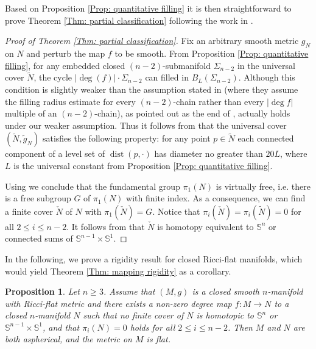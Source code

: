 \documentclass[11pt,letterpaper]{amsart}
\numberwithin{equation}{section}
\newtheorem{proposition}[theorem]{Proposition}
\theoremstyle{definition}
\DeclareMathOperator{\dist}{dist}
\begin{document}
Based on Proposition \ref{Prop: quantitative filling} it is then straightforward to prove Theorem \ref{Thm: partial classification} following the work in \cite{CLL23}.

\begin{proof}[Proof of Theorem \ref{Thm: partial classification}]
Fix an arbitrary smooth metric $g_N$ on $N$ and perturb the map $f$ to be smooth.
{
From Proposition \ref{Prop: quantitative filling}, for any embedded closed $(n-2)$-submanifold $\Sigma_{n-2}$ in the universal cover $\tilde N$, the cycle $|\deg(f)|\cdot\Sigma_{n-2}$ can filled in $B_{L}(\Sigma_{n-2})$.
Although this condition is slightly weaker than the assumption stated in \cite[Proposition 8]{CLL23} (where they assume the filling radius estimate for every $(n-2)$-chain rather than every $|\deg f|$ multiple of an $(n-2)$-chain), as pointed out as the end of \cite{CLL23}, \cite[Proposition 8]{CLL23} actually holds under our weaker assumption. Thus it follows from \cite[Proposition 8]{CLL23} that the universal cover $(\tilde N,\tilde g_N)$ satisfies the following property: for any point $p\in \tilde N$ each connected component of a level set of $\dist(p,\cdot)$ has diameter no greater than $20L$, where $L$ is the universal constant from Proposition \ref{Prop: quantitative filling}.}

Using \cite[Corollary 14]{CLL23} we conclude that the fundamental group $\pi_1(N)$ is virtually free, i.e. there is a free subgroup $G$ of $\pi_1(N)$ with finite index. As a consequence, we can find a finite cover $\check N$ of $N$ with $\pi_1(\check N)= G$. Notice that $\pi_i(\check N)=\pi_i(\tilde N)=0$ for all $2\leq i\leq n-2$. It follows from \cite[Section 2 and 3]{GS09} that $\check N$ is homotopy equivalent to $\mathbb S^n$ or connected sums of $\mathbb S^{n-1}\times \mathbb S^1$.
\end{proof}



In the following, we prove a rigidity result for closed Ricci-flat manifolds, which would yield
Theorem \ref{Thm: mapping rigidity} as a corollary.

\begin{proposition}\label{Prop: mapping rigidity general n}
Let $n \ge 3$. Assume that $(M,g)$ is a closed smooth $n$-manifold with Ricci-flat metric and there exists a non-zero degree map $f: M \to N$ to a closed $n$-manifold $N$ such that no finite cover of $N$ is homotopic to $\mathbb{S}^n$ or $\mathbb{S}^{n-1} \times \mathbb{S}^1$, and that $\pi_i(N) = 0$ holds for all $2 \le i \le n-2$. Then $M$ and $N$ are both aspherical, and the metric on $M$ is flat.
\end{proposition}
\end{document}
